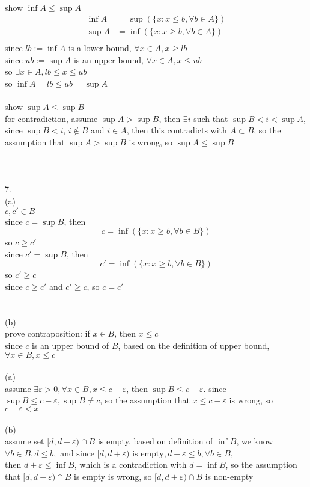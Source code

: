 \documentclass[12pt, border = 4pt, multi]{article} %
\begin{document}
\\
show $\inf A \leq \sup A$\\
\begin{align*}
\inf A &= \sup(\{x : x \leq b, \forall b \in A\})\\
\sup A &= \inf(\{x: x \geq b, \forall b \in A\})\\
\end{align*}
since $lb := \inf A$ is a lower bound, $\forall x \in A, x \geq lb$\\
since $ub := \sup A$ is an upper bound, $\forall x \in A, x \leq ub$\\
so $\exists x \in A, lb \leq x \leq ub$\\
so $\inf A = lb \leq ub = \sup A$\\
\\
show $\sup A \leq \sup B$\\
for contradiction, assume $\sup A > \sup B$, then $\exists i$ such that $\sup B < i < \sup A$, since $\sup B < i$, $i \not\in B$ and $i \in A$, then this contradicts with $A \subset B$, so the assumption that $\sup A > \sup B$ is wrong, so $\sup A \leq \sup B$\\
\\
\\
\\
7.\\
(a)\\
$c, c' \in B$\\
since $c = \sup B$, then
\[c = \inf(\{x: x \geq b, \forall b \in B\})\]
so $c \geq c'$\\
since $c' = \sup B$, then
\[c' = \inf(\{x: x \geq b, \forall b \in B\})\]
so $c' \geq c$\\
since $c \geq c'$ and $c' \geq c$, so $c = c'$\\
\\
\\
(b)\\
prove contraposition: if $x \in B$, then $x \leq c$\\
since $c$ is an upper bound of $B$, based on the definition of upper bound, $\forall x \in B, x \leq c$\\
\newpage
{}\\
(a)\\
assume $\exists \varepsilon > 0, \forall x \in B, x \leq c - \varepsilon$, then $\sup B \leq c - \varepsilon$. since $\sup B \leq c - \varepsilon, \sup B \not= c$, so the assumption that $x \leq c - \varepsilon$ is wrong, so $c - \varepsilon < x$\\
\\
(b)\\
assume set $[d, d + \varepsilon) \cap B$ is empty, based on definition of $\inf B$, we know $\forall b \in B, d \leq b, \text{ and since } [d, d + \varepsilon) \text{ is empty}, d + \varepsilon \leq b, \forall b \in B$,\\
then $d + \varepsilon \leq \inf B$, which is a contradiction with $d = \inf B$, so the assumption that $[d, d + \varepsilon) \cap B$ is empty is wrong, so $[d, d + \varepsilon) \cap B$ is non-empty
\end{document}
